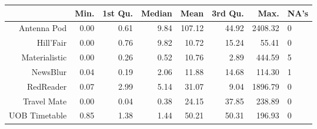 \begin{table}[ht]
\centering
\begin{tabular}{rrrrrrr}
  \hline
 & Min. & 1st Qu. & Median & Mean & 3rd Qu. & Max. & NA's\\ 
  \hline
Antenna Pod & 0.00 & 0.61 & 9.84 & 107.12 & 44.92 & 2408.32 & 0 \\ 
  Hill'Fair & 0.00 & 0.76 & 9.82 & 10.72 & 15.24 & 55.41 & 0 \\ 
  Materialistic & 0.00 & 0.26 & 0.52 & 10.76 & 2.89 & 444.59 & 5 \\ 
  NewsBlur & 0.04 & 0.19 & 2.06 & 11.88 & 14.68 & 114.30 & 1\\ 
  RedReader & 0.07 & 2.99 & 5.14 & 31.07 & 9.04 & 1896.79 & 0\\ 
  Travel Mate & 0.00 & 0.04 & 0.38 & 24.15 & 37.85 & 238.89 & 0 \\ 
  UOB Timetable & 0.85 & 1.38 & 1.44 & 50.21 & 50.31 & 196.93 &0\\ 
   \hline
\end{tabular}
\end{table}
